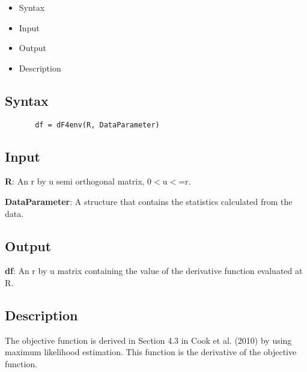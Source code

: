 \documentclass[a4paper,11pt,openany]{memoir}
\begin{document}
\begin{itemize}
\setlength{\itemsep}{-1ex}
   \item Syntax
   \item Input
   \item Output
   \item Description
\end{itemize}


\subsection*{Syntax}


\begin{verbatim}       df = dF4env(R, DataParameter)\end{verbatim}
    

\subsection*{Input}

\begin{par}
\textbf{R}: An r by u semi orthogonal matrix, 0\ensuremath{<}u\ensuremath{<}=r.
\end{par} \vspace{1em}
\begin{par}
\textbf{DataParameter}: A structure that contains the statistics calculated from the data.
\end{par} \vspace{1em}


\subsection*{Output}

\begin{par}
\textbf{df}: An r by u matrix containing the value of the derivative function evaluated at R.
\end{par} \vspace{1em}


\subsection*{Description}

\begin{par}
The objective function is derived in Section 4.3 in Cook et al. (2010) by  using maximum likelihood estimation. This function is the derivative of  the objective function.
\end{par} \vspace{1em}
\end{document}
